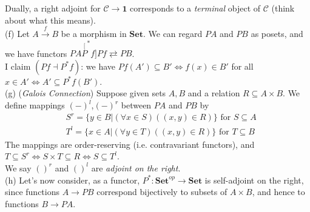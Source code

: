 \documentclass[a4paper]{article}
\begin{document}
\begin{eg}
    Dually, a right adjoint for $\mathcal{C} \to \mathbf{1}$ corresponds to a \emph{terminal} object of $\mathcal{C}$ (think about what this means).\\
    (f) Let $A \xrightarrow{f} B$ be a morphism in $\mathbf{Set}$. We can regard $PA$ and $PB$ as posets, and we have functors $PA \stackrel[P^*f]{Pf}{\rightleftarrows} PB$.\\
    I claim $(Pf \dashv P^*f)$: we have $Pf(A') \subseteq B' \iff f(x) \in B'$ for all $x \in A' \iff A' \subseteq P^* f(B')$.\\
    (g) (\emph{Galois Connection}) Suppose given sets $A,B$ and a relation $R \subseteq A \times B$. We define mappings $(-)^l$,$(-)^r$ between $PA$ and $PB$ by 
    \begin{equation*}
        \begin{aligned}
            &S^r = \{y \in B| (\forall x \in S) ((x,y) \in R) \} \text{ for } S \subseteq A\\
            &T^l = \{x \in A | (\forall y \in T) ((x,y) \in R)\} \text{ for } T \subseteq B
        \end{aligned}
    \end{equation*}
    The mappings are order-reserving (i.e. contravariant functors), and $T \subseteq S^r \iff S \times T \subseteq R \iff S \subseteq T^l$.\\
    We say $()^r$ and $()^l$ are \emph{adjoint on the right}.\\
    (h) Let's now consider, as a functor, $P^* : \mathbf{Set}^{op} \to \mathbf{Set}$ is self-adjoint on the right, since functions $A \to PB$ correspond bijectively to subsets of $A \times B$, and hence to functions $B \to PA$.
\end{eg}
\end{document}
